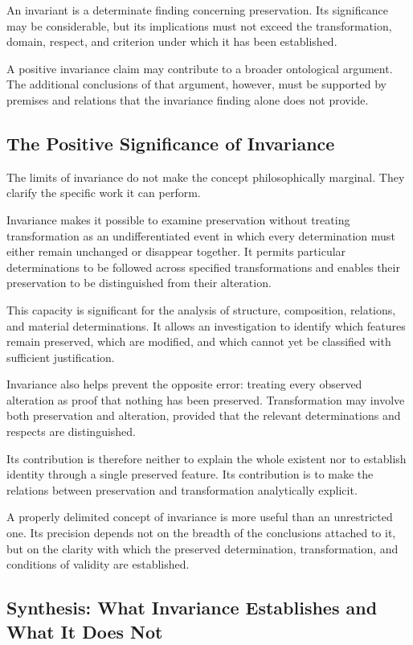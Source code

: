 An invariant is a determinate finding concerning
preservation. Its significance may be considerable,
but its implications must not exceed the transformation,
domain, respect, and criterion under which it has
been established.

A positive invariance claim may contribute to a broader
ontological argument. The additional conclusions of
that argument, however, must be supported by premises
and relations that the invariance finding alone does
not provide.

\subsection{The Positive Significance of Invariance}

The limits of invariance do not make the concept
philosophically marginal. They clarify the specific
work it can perform.

Invariance makes it possible to examine preservation
without treating transformation as an undifferentiated
event in which every determination must either remain
unchanged or disappear together. It permits particular
determinations to be followed across specified
transformations and enables their preservation to
be distinguished from their alteration.

This capacity is significant for the analysis of
structure, composition, relations, and material
determinations. It allows an investigation to identify
which features remain preserved, which are modified,
and which cannot yet be classified with sufficient
justification.

Invariance also helps prevent the opposite error:
treating every observed alteration as proof that
nothing has been preserved. Transformation may
involve both preservation and alteration, provided
that the relevant determinations and respects are
distinguished.

Its contribution is therefore neither to explain
the whole existent nor to establish identity through
a single preserved feature. Its contribution is to
make the relations between preservation and
transformation analytically explicit.

A properly delimited concept of invariance is more
useful than an unrestricted one. Its precision depends
not on the breadth of the conclusions attached to
it, but on the clarity with which the preserved
determination, transformation, and conditions of
validity are established.

\subsection{Synthesis: What Invariance Establishes and What It Does Not}

